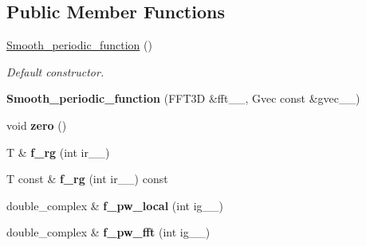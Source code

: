 \subsection*{Public Member Functions}
\begin{DoxyCompactItemize}
\item 
\hyperlink{classsirius_1_1experimental_1_1_smooth__periodic__function_a43dfb8a7a4884af8bc7e136cd21505a1}{Smooth\+\_\+periodic\+\_\+function} ()
\begin{DoxyCompactList}\small\item\em Default constructor. \end{DoxyCompactList}\item 
\hypertarget{classsirius_1_1experimental_1_1_smooth__periodic__function_a47462797689c6207e7a0b5d15b9866bc}{}{\bfseries Smooth\+\_\+periodic\+\_\+function} (F\+F\+T3\+D \&fft\+\_\+\+\_\+, Gvec const \&gvec\+\_\+\+\_\+)\label{classsirius_1_1experimental_1_1_smooth__periodic__function_a47462797689c6207e7a0b5d15b9866bc}

\item 
\hypertarget{classsirius_1_1experimental_1_1_smooth__periodic__function_a2e1b1acf362db16417f659259a9328a5}{}void {\bfseries zero} ()\label{classsirius_1_1experimental_1_1_smooth__periodic__function_a2e1b1acf362db16417f659259a9328a5}

\item 
\hypertarget{classsirius_1_1experimental_1_1_smooth__periodic__function_acce11470fb17df3f73906617bd3001d9}{}T \& {\bfseries f\+\_\+rg} (int ir\+\_\+\+\_\+)\label{classsirius_1_1experimental_1_1_smooth__periodic__function_acce11470fb17df3f73906617bd3001d9}

\item 
\hypertarget{classsirius_1_1experimental_1_1_smooth__periodic__function_a563dcf1f07be985b8ce5a9beae7b93a1}{}T const \& {\bfseries f\+\_\+rg} (int ir\+\_\+\+\_\+) const \label{classsirius_1_1experimental_1_1_smooth__periodic__function_a563dcf1f07be985b8ce5a9beae7b93a1}

\item 
\hypertarget{classsirius_1_1experimental_1_1_smooth__periodic__function_a80fdca90abc5caeb7568818274dc411a}{}double\+\_\+complex \& {\bfseries f\+\_\+pw\+\_\+local} (int ig\+\_\+\+\_\+)\label{classsirius_1_1experimental_1_1_smooth__periodic__function_a80fdca90abc5caeb7568818274dc411a}

\item 
\hypertarget{classsirius_1_1experimental_1_1_smooth__periodic__function_a84ec9530ba3ef93bd0056649d186ff51}{}double\+\_\+complex \& {\bfseries f\+\_\+pw\+\_\+fft} (int ig\+\_\+\+\_\+)\label{classsirius_1_1experimental_1_1_smooth__periodic__function_a84ec9530ba3ef93bd0056649d186ff51}


\end{DoxyCompactItemize}
